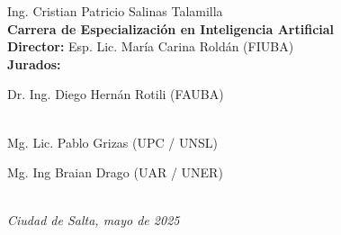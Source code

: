\begin{titlepage}
\begin{flushright}
        {\fontsize{20pt}{25pt}\selectfont
        Ing. Cristian Patricio Salinas Talamilla} \\[1cm]

        {\fontsize{15pt}{20pt}\selectfont
        \textbf{Carrera de Especialización en Inteligencia Artificial}
        } \\[2cm]

        {\fontsize{11pt}{15pt}\selectfont
        \textbf{Director:} Esp. Lic. María Carina Roldán (FIUBA)} \\[1cm]

        {\fontsize{11pt}{15pt}\selectfont
        \textbf{Jurados:}} \\[0.5cm]
        {\fontsize{11pt}{15pt}\selectfont
        

Dr. Ing. Diego Hernán Rotili (FAUBA)} \\ 
        {\fontsize{11pt}{15pt}\selectfont
        Mg. Lic. Pablo Grizas (UPC / UNSL)} \\ 
        {\fontsize{11pt}{15pt}\selectfont
        

Mg. Ing Braian Drago (UAR / UNER)} \\[2cm]

        {\itshape\fontsize{10pt}{12pt}\selectfont
        Ciudad de Salta, mayo de 2025} %
    \end{flushright}
\end{titlepage}

